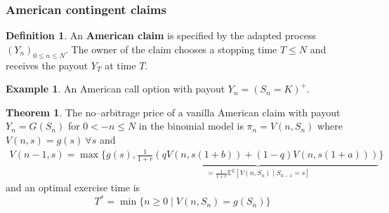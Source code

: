 \documentclass{article}
\theoremstyle{definition}
\newtheorem{theorem}{Theorem}[section]
\newtheorem{example}{Example}[section]
\newtheorem{defn}{Definition}[section]
\begin{document}
\subsubsection*{American contingent claims}
\begin{defn}
    An \textbf{American claim} is specified by the adapted process $(Y_n)_{0\le n\le N}$. The owner of the claim chooses a stopping time $T\le N$ and receives the payout $Y_T$ at time $T$.
\end{defn}
\begin{example}
    An American call option with payout $Y_n = (S_n=K)^+$.
\end{example}
\begin{theorem}
    The no--arbitrage price of a vanilla American claim with payout $Y_n=G(S_n)$ for $0<-n\le N$ in the binomial model is $\pi_n = V(n,S_n)$ where $V(n,s)=g(s) ~\forall s$ and 
    \begin{align*}
        V(n-1,s) = \max \{g(s), \underbrace{\frac{1}{1+r}\left(qV(n,s(1+b)) + (1-q)V(n,s(1+a))\right)}_{=\frac{1}{1+r}\mathbb{E}^\mathbb{Q}[V(n,S_n)\mid S_{n-1}=s]}\}
    \end{align*}
    and an optimal exercise time is \[
    T^* = \min \{n\ge 0 \mid V(n,S_n)=g(S_n)\}
    \]
\end{theorem}
\end{document}
